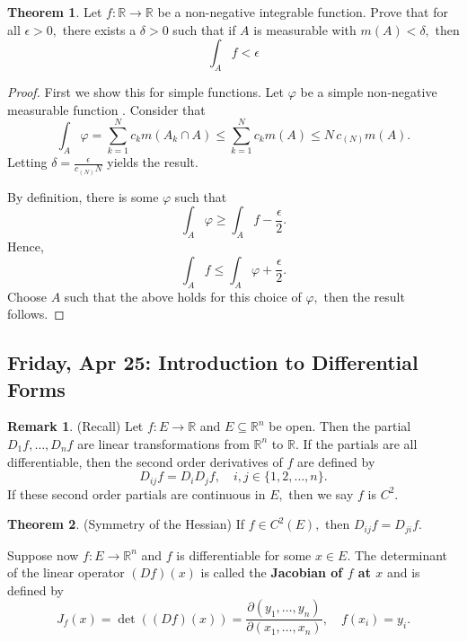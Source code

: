 \documentclass[10pt, oneside]{article}
\newcommand{\bbR}{\mathbb{R}}
\theoremstyle{definition}
\newtheorem{thm}{Theorem}
\newtheorem{rem}{Remark}
\begin{document}
\newpage
\begin{thm}
    Let $f: \bbR \to \bbR$ be a non-negative integrable function. Prove that for all $\epsilon>0,$ there exists a $\delta>0$ such that if $A$ is measurable with $m(A) < \delta,$ then 
    \[\int_A f < \epsilon\]
\end{thm}
\begin{proof}
    First we show this for simple functions. Let $\varphi$ be a simple non-negative measurable function . Consider that 
    \[\int_A \varphi = \sum_{k=1}^N c_k m(A_k \cap A) \leq \sum_{k=1}^N c_k m(A) \leq N\,c_{(N)} m(A).\] Letting $\delta = \frac{\epsilon}{c_{(N)} N}$ yields the result. 

By definition, there is some $\varphi$ such that \[\int_A \varphi \geq \int_A f - \frac{\epsilon}{2}.\] Hence, 
\[\int_A f \leq \int_A \varphi  + \frac{\epsilon}{2}.\] Choose $A$ such that the above holds for this choice of $\varphi,$ then the result follows. 
\end{proof}

\newpage
\subsection{Friday, Apr 25: Introduction to Differential Forms}
\begin{rem} (Recall)
    Let $f: E\to \bbR$ and $E\subseteq \bbR^n$ be open. Then the partial $D_1 f, \dots, D_n f$ are linear transformations from $\bbR^n$ to $\bbR.$ If the partials are all differentiable, then the second order derivatives of $f$ are defined by 
    \[D_{ij}f = D_i D_j f, \quad i,j \in \{1,2, \dots, n\}.\] If these second order partials are continuous in $E,$ then we say $f$ is $C^2.$ 
\begin{thm} (Symmetry of the Hessian)
    If $f \in C^2(E),$ then $D_{ij}f = D_{ji}f.$ 
\end{thm} Suppose now $f: E\to \bbR^n$ and $f$ is differentiable for some $x\in E.$ The determinant of the linear operator $(Df)(x)$ is called the \textbf{Jacobian of $f$ at $x$} and is defined by 
\[J_f(x) = \det ((Df)(x)) = \frac{\partial (y_1, \dots, y_n)}{\partial(x_1, \dots, x_n)}, \quad f(x_i) = y_i.\]
\end{rem}
\end{document}
